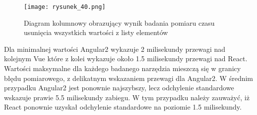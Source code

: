 \begin{figure}[htbp]
    \centering
    \texttt{[image: rysunek\_40.png]}
    \caption{Diagram kolumnowy obrazujący wynik badania pomiaru czasu usunięcia wszystkich wartości z listy elementów}
    \label{fig:rysunek_40}
\end{figure}

Dla minimalnej wartości Angular2 wykazuje 2 milisekundy przewagi nad kolejnym Vue które z kolei wykazuje około 1.5 milisekundy przewagi nad React.
Wartości maksymalne dla każdego badanego narzędzia mieszczą się w granicy błędu pomiarowego, z delikatnym wskazaniem przewagi dla Angular2.
W średnim przypadku Angular2 jest ponownie najszybszy, lecz odchylenie standardowe wskazuje prawie 5.5 milisekundy zabiegu.
W tym przypadku należy zauważyć, iż React ponownie uzyskał odchylenie standardowe na poziomie 1.5 milisekundy.

\let\cleardoublepage\clearpage